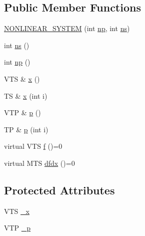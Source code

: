 \subsection*{Public Member Functions}
\begin{DoxyCompactItemize}
\item 
\mbox{\hyperlink{class_n_o_n_l_i_n_e_a_r___s_y_s_t_e_m_aa6073542adb090bf99729df5b03ca707}{N\+O\+N\+L\+I\+N\+E\+A\+R\+\_\+\+S\+Y\+S\+T\+EM}} (int \mbox{\hyperlink{class_n_o_n_l_i_n_e_a_r___s_y_s_t_e_m_ab5876470030832088d8ee1ed609d5311}{np}}, int \mbox{\hyperlink{class_n_o_n_l_i_n_e_a_r___s_y_s_t_e_m_abf4102c649f8316e44033a76f9d6183f}{ns}})
\item 
int \mbox{\hyperlink{class_n_o_n_l_i_n_e_a_r___s_y_s_t_e_m_abf4102c649f8316e44033a76f9d6183f}{ns}} ()
\item 
int \mbox{\hyperlink{class_n_o_n_l_i_n_e_a_r___s_y_s_t_e_m_ab5876470030832088d8ee1ed609d5311}{np}} ()
\item 
V\+TS \& \mbox{\hyperlink{class_n_o_n_l_i_n_e_a_r___s_y_s_t_e_m_a74d8eaa53624eae38a6f2e6b5bdd4381}{x}} ()
\item 
TS \& \mbox{\hyperlink{class_n_o_n_l_i_n_e_a_r___s_y_s_t_e_m_aabd6041ce7d6aaad8ce55e03c2efde1e}{x}} (int i)
\item 
V\+TP \& \mbox{\hyperlink{class_n_o_n_l_i_n_e_a_r___s_y_s_t_e_m_a1536a98a6cb3fec681bdd3312ae43714}{p}} ()
\item 
TP \& \mbox{\hyperlink{class_n_o_n_l_i_n_e_a_r___s_y_s_t_e_m_a75739c8370b0aa04f8f03e88ac19d09b}{p}} (int i)
\item 
virtual V\+TS \mbox{\hyperlink{class_n_o_n_l_i_n_e_a_r___s_y_s_t_e_m_a65827d7df297f26cd3f14f472a212077}{f}} ()=0
\item 
virtual M\+TS \mbox{\hyperlink{class_n_o_n_l_i_n_e_a_r___s_y_s_t_e_m_a531f56bcbc77f2219164af40aa16fad2}{dfdx}} ()=0
\end{DoxyCompactItemize}
\subsection*{Protected Attributes}
\begin{DoxyCompactItemize}
\item 
V\+TS \mbox{\hyperlink{class_n_o_n_l_i_n_e_a_r___s_y_s_t_e_m_a06e2289a0e10aa47527d5fd348faf4f9}{\+\_\+x}}
\item 
V\+TP \mbox{\hyperlink{class_n_o_n_l_i_n_e_a_r___s_y_s_t_e_m_aee48110f36d056d217437af5e7cc5447}{\+\_\+p}}
\end{DoxyCompactItemize}


